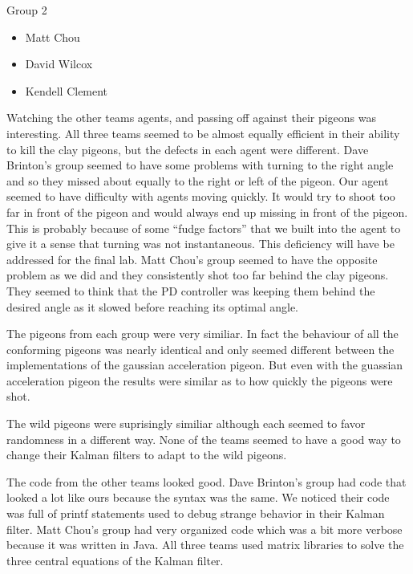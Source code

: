 Group 2
\begin{itemize}
	\item{Matt Chou}
	\item{David Wilcox}
	\item{Kendell Clement}
\end{itemize}
\par
Watching the other teams agents, and passing off against their pigeons was interesting.  All three teams seemed to be almost equally efficient in their ability to kill the clay pigeons, but the defects in each agent were different.  Dave Brinton's group seemed to have some problems with turning to the right angle and so they missed about equally to the right or left of the pigeon.  Our agent seemed to have difficulty with agents moving quickly.  It would try to shoot too far in front of the pigeon and would always end up missing in front of the pigeon.  This is probably because of some ``fudge factors'' that we built into the agent to give it a sense that turning was not instantaneous.  This deficiency will have be addressed for the final lab.  Matt Chou's group seemed to have the opposite problem as we did and they consistently shot too far behind the clay pigeons.  They seemed to think that the PD controller was keeping them behind the desired angle as it slowed before reaching its optimal angle.
\par
The pigeons from each group were very similiar.  In fact the behaviour of all the conforming pigeons was nearly identical and only seemed different between the implementations of the gaussian acceleration pigeon.  But even with the guassian acceleration pigeon the results were similar as to how quickly the pigeons were shot.
\par
The wild pigeons were suprisingly similiar although each seemed to favor randomness in a different way.  None of the teams seemed to have a good way to change their Kalman filters to adapt to the wild pigeons.
\par
The code from the other teams looked good.  Dave Brinton's group had code that looked a lot like ours because the syntax was the same.  We noticed their code was full of printf statements used to debug strange behavior in their Kalman filter.  Matt Chou's group had very organized code which was a bit more verbose because it was written in Java.  All three teams used matrix libraries to solve the three central equations of the Kalman filter.